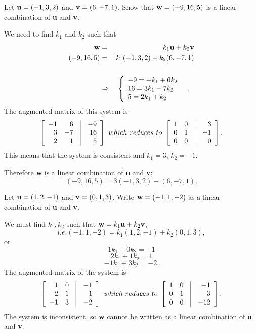 \begin{example}
\label{exam5.lincomb} Let ${\bf u}=(-1,3,2)$ and ${\bf
v}=(6,-7,1)$.  Show that ${\bf w}=(-9,16,5)$ is a linear
combination of {\bf u} and {\bf v}.

We need to find $k_1$ and $k_2$ such that
\begin{eqnarray*}
{\bf w}&=&k_1{\bf u}+k_2{\bf v}\\
(-9,16,5)&=&k_1(-1,3,2)+k_2(6,-7,1)\\
\\ &\Rightarrow& \left \{ \begin{array}{l}
                            -9=-k_1+6k_2\\
                            16=3k_1-7k_2 \quad \quad .  \\
                            5=2k_1+k_2\end{array} \right .
\end{eqnarray*}
The augmented matrix of this system is $$\left[
\begin{array}{rrcr}-1&6&\vline&-9 \\ 3&-7&\vline&16 \\
2&1&\vline&5 \end{array} \right]~which~reduces~to~\left[
\begin{array}{rrcr}1&0&\vline&3 \\ 0&1&\vline&-1 \\
0&0&\vline&0 \end{array} \right].$$ This means that the system is
consistent and $k_1=3$, $k_2=-1$.

\noindent Therefore {\bf w} is a linear combination of {\bf u} and
{\bf v}: $$(-9,16,5)=3(-1,3,2)-(6,-7,1).$$
\end{example}
\begin{example}
\label{exam5.lincomb2}
Let ${\bf u}=(1,2,-1)$ and ${\bf v}=(0,1,3)$.  Write ${\bf w}=(-1,1,-2)$ as
a linear combination of {\bf u} and {\bf v}.

We must find $k_1, k_2$ such that
${\bf w}=k_1{\bf u}+k_2{\bf v}$,
$$i.e. (-1,1,-2)=k_1(1,2,-1)+k_2(0,1,3),$$
or
$$ 1k_1+0k_2=-1$$
$$2k_1+1k_2=1$$
$$-1k_1+3k_2=-2.$$
The augmented matrix of the system is
$$\left[\begin{array}{rrcr} 1&0&\vline&-1\\
2&1&\vline&1\\
-1&3&\vline&-2\end{array}\right]~which~reduces~to~\left[
\begin{array}{rrcr}1&0&\vline&-1 \\ 0&1&\vline&3 \\
0&0&\vline&-12 \end{array} \right].$$
The system is inconsistent, so {\bf w} cannot be written as a linear combination of
{\bf u} and {\bf v}.
\end{example}

